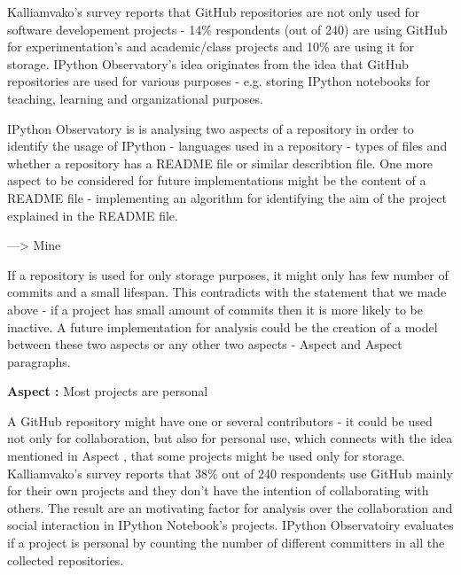 Kalliamvako's survey\cite{kalliamvakoupromises} reports that GitHub repositories are not only used for software developement projects - 14\% respondents (out of 240) are using GitHub for experimentation's and academic/class projects and 10\% are using it for storage. IPython Observatory's idea originates from the idea that GitHub repositories are used for various purposes - e.g. storing IPython notebooks for teaching, learning and organizational purposes. 

IPython Observatory is is analysing two aspects of a repository in order to identify the usage of IPython - languages used in a repository - types of files and whether a repository has a README file or similar describtion file. One more aspect to be considered for future implementations might be the content of a README file - implementing an algorithm for identifying the aim of the project explained in the README file. 

---> Mine

If a repository is used for only storage purposes, it might only has few number of commits and a small lifespan. This contradicts with the statement that we made above - if a project has small amount of commits then it is more likely to be inactive. A future implementation for analysis could be the creation of a model between these two aspects or any other two aspects - Aspect  and Aspect  paragraphs.


\vspace{5mm}
\begin{mdframed}
\vspace{1px}
\textbf{Aspect :}  Most projects are personal
\vspace{1px}
\end{mdframed}
\vspace{2mm}

A GitHub repository might have one or several contributors - it could be used not only for collaboration, but also for personal use, which connects with the idea mentioned in Aspect , that some projects might be used only for storage. Kalliamvako's survey\cite{kalliamvakoupromises} reports that 38\% out of 240 respondents use GitHub mainly for their own projects and they don't have the intention of collaborating with others. The result are an motivating factor for analysis over the collaboration and social interaction in IPython Notebook's projects. IPython Observatoiry evaluates if a project is
personal by counting the number of different committers in all the collected repositories.

